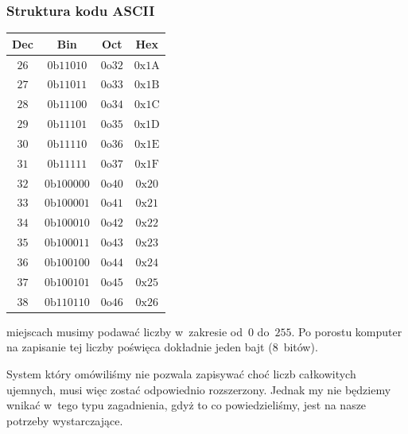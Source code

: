 \documentclass[10pt,t]{beamer}
\newcommand{\btext}{\text{b}}
\newcommand{\otext}{\text{o}}
\newcommand{\xtext}{\text{x}}
\newcommand{\Atext}{\text{A}}
\newcommand{\Btext}{\text{B}}
\newcommand{\Ctext}{\text{C}}
\newcommand{\Dtext}{\text{D}}
\newcommand{\Etext}{\text{E}}
\newcommand{\Ftext}{\text{F}}
\begin{document}
\begin{frame}
  \frametitle{Struktura kodu ASCII}


  \begin{center}

    \begin{tabular}{|c|c|c|c|}
      \hline
      Dec & Bin & Oct & Hex \\
      \hline
      $26$ & $0\btext 1 1010$\hphantom{0} & $0\otext 32$
                      & $0\xtext 1\Atext$ \\
      $27$ & $0\btext 1 1011$\hphantom{0} & $0\otext 33$
                      & $0\xtext 1\Btext$ \\
      $28$ & $0\btext 1 1100$\hphantom{0} & $0\otext 34$
                      & $0\xtext 1\Ctext$ \\
      $29$ & $0\btext 1 1101$\hphantom{0} & $0\otext 35$
                      & $0\xtext 1\Dtext$ \\
      $30$ & $0\btext 1 1110$\hphantom{0} & $0\otext 36$
                      & $0\xtext 1\Etext$ \\
      $31$ & $0\btext 1 1111$\hphantom{0} & $0\otext 37$
                      & $0\xtext 1\Ftext$ \\
      $32$ & $0\btext 10 0000$ & $0\otext 40$ & $0\xtext 20$ \\
      $33$ & $0\btext 10 0001$ & $0\otext 41$ & $0\xtext 21$ \\
      $34$ & $0\btext 10 0010$ & $0\otext 42$ & $0\xtext 22$ \\
      $35$ & $0\btext 10 0011$ & $0\otext 43$ & $0\xtext 23$ \\
      $36$ & $0\btext 10 0100$ & $0\otext 44$ & $0\xtext 24$ \\
      $37$ & $0\btext 10 0101$ & $0\otext 45$ & $0\xtext 25$ \\
      $38$ & $0\btext 11 0110$ & $0\otext 46$ & $0\xtext 26$ \\
      \hline
    \end{tabular}

  \end{center}

\end{frame}


  miejscach musimy podawać liczby w~zakresie od~$0$ do~$255$. Po porostu
  komputer na zapisanie tej liczby poświęca dokładnie jeden bajt ($8$~bitów).

  System który omówiliśmy nie pozwala zapisywać choć liczb całkowitych
  ujemnych, musi więc zostać odpowiednio rozszerzony. Jednak my nie będziemy
  wnikać w~tego typu zagadnienia, gdyż to co powiedzieliśmy, jest na nasze
  potrzeby wystarczające.
\end{document}
